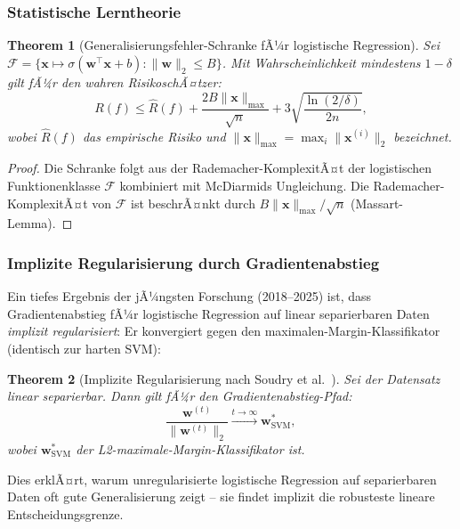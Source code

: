 ﻿\documentclass[12pt, a4paper]{article}
\newtheorem{theorem}{Theorem}[section]
\theoremstyle{definition}
\theoremstyle{remark}
\newcommand{\sigmoid}{\sigma}
\newcommand{\vw}{\bm{w}}
\newcommand{\vx}{\bm{x}}
\newcommand{\T}{\top}
\begin{document}
\subsubsection{Statistische Lerntheorie}

\begin{theorem}[Generalisierungsfehler-Schranke fÃ¼r logistische Regression]
  Sei $\mathcal{F} = \{\vx \mapsto \sigmoid(\vw^\T\vx+b) : \|\vw\|_2 \leq B\}$. Mit
  Wahrscheinlichkeit mindestens $1-\delta$ gilt fÃ¼r den wahren RisikoschÃ¤tzer:
  \begin{equation}
    R(f) \leq \hat{R}(f) + \frac{2B\|\vx\|_{\max}}{\sqrt{n}} + 3\sqrt{\frac{\ln(2/\delta)}{2n}},
    \label{eq:generalization}
  \end{equation}
  wobei $\hat{R}(f)$ das empirische Risiko und $\|\vx\|_{\max} = \max_i\|\vx^{(i)}\|_2$ bezeichnet.
\end{theorem}

\begin{proof}
  Die Schranke folgt aus der Rademacher-KomplexitÃ¤t der logistischen Funktionenklasse
  $\mathcal{F}$ kombiniert mit McDiarmids Ungleichung. Die Rademacher-KomplexitÃ¤t von
  $\mathcal{F}$ ist beschrÃ¤nkt durch $B\|\vx\|_{\max}/\sqrt{n}$ (Massart-Lemma). 
\end{proof}

\subsubsection{Implizite Regularisierung durch Gradientenabstieg}

Ein tiefes Ergebnis der jÃ¼ngsten Forschung (2018--2025) ist, dass Gradientenabstieg fÃ¼r
logistische Regression auf linear separierbaren Daten \emph{implizit regularisiert}: Er
konvergiert gegen den maximalen-Margin-Klassifikator (identisch zur harten SVM):

\begin{theorem}[Implizite Regularisierung nach Soudry et al.~\citep{soudry2018implicit}]
  Sei der Datensatz linear separierbar. Dann gilt fÃ¼r den Gradientenabstieg-Pfad:
  \[
    \frac{\vw^{(t)}}{\|\vw^{(t)}\|_2} \xrightarrow{t\to\infty} \vw^*_{\mathrm{SVM}},
  \]
  wobei $\vw^*_{\mathrm{SVM}}$ der L2-maximale-Margin-Klassifikator ist.
\end{theorem}

Dies erklÃ¤rt, warum unregularisierte logistische Regression auf separierbaren Daten oft
gute Generalisierung zeigt -- sie findet implizit die robusteste lineare Entscheidungsgrenze.
\end{document}

